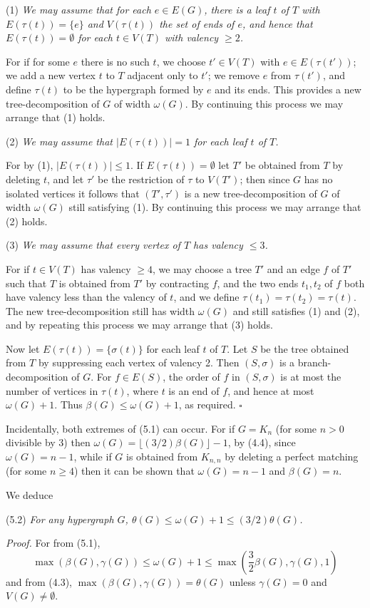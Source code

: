 \hspace*{12pt}(1) \textit{We may assume that for each $e \in E(G)$, there is a leaf $t$ of $T$ with $E(\tau(t)) = \{e\}$ and $V(\tau(t))$ the set of ends of $e$, and hence that $E(\tau(t)) = \emptyset$ for each $t \in V(T)$ with valency $\ge 2$.}

For if for some $e$ there is no such $t$, we choose $t' \in V(T)$ with $e \in E(\tau(t'))$; we add a new vertex $t$ to $T$ adjacent only to $t'$; we remove $e$ from $\tau(t')$, and define $\tau(t)$ to be the hypergraph formed by $e$ and its ends. This provides a new tree-decomposition of $G$ of width $\omega(G)$. By continuing this process we may arrange that (1) holds.

\hspace*{12pt}(2) \textit{We may assume that $|E(\tau(t))| = 1$ for each leaf $t$ of $T$.}

For by (1), $|E(\tau(t))| \le 1$. If $E(\tau(t)) = \emptyset$ let $T'$ be obtained from $T$ by deleting $t$, and let $\tau'$ be the restriction of $\tau$ to $V(T')$; then since $G$ has no isolated vertices it follows that $(T', \tau')$ is a new tree-decomposition of $G$ of width $\omega(G)$ still satisfying (1). By continuing this process we may arrange that (2) holds.

\hspace*{12pt}(3) \textit{We may assume that every vertex of $T$ has valency $\le 3$.}

For if $t \in V(T)$ has valency $\ge 4$, we may choose a tree $T'$ and an edge $f$ of $T'$ such that $T$ is obtained from $T'$ by contracting $f$, and the two ends $t_1, t_2$ of $f$ both have valency less than the valency of $t$, and we define $\tau(t_1) = \tau(t_2) = \tau(t)$. The new tree-decomposition still has width $\omega(G)$ and still satisfies (1) and (2), and by repeating this process we may arrange that (3) holds.

Now let $E(\tau(t)) = \{\sigma(t)\}$ for each leaf $t$ of $T$. Let $S$ be the tree obtained from $T$ by suppressing each vertex of valency 2. Then $(S, \sigma)$ is a branch-decomposition of $G$. For $f \in E(S)$, the order of $f$ in $(S, \sigma)$ is at most the number of vertices in $\tau(t)$, where $t$ is an end of $f$, and hence at most $\omega(G) + 1$. Thus $\beta(G) \le \omega(G) + 1$, as required. $\square$

Incidentally, both extremes of (5.1) can occur. For if $G = K_n$ (for some $n > 0$ divisible by 3) then $\omega(G) = \lfloor (3/2) \beta(G) \rfloor - 1$, by (4.4), since $\omega(G) = n - 1$, while if $G$ is obtained from $K_{n,n}$ by deleting a perfect matching (for some $n \ge 4$) then it can be shown that $\omega(G) = n - 1$ and $\beta(G) = n$.

We deduce

\stmt
(5.2) \textit{For any hypergraph $G$, $\theta(G) \le \omega(G) + 1 \le (3/2) \theta(G)$.}

\textit{Proof.} For from (5.1),
\begin{equation*}
\max(\beta(G), \gamma(G)) \le \omega(G) + 1 \le \max(\frac{3}{2}\beta(G), \gamma(G), 1)
\end{equation*}
and from (4.3), $\max(\beta(G), \gamma(G)) = \theta(G)$ unless $\gamma(G) = 0$ and $V(G) \ne \emptyset$.

